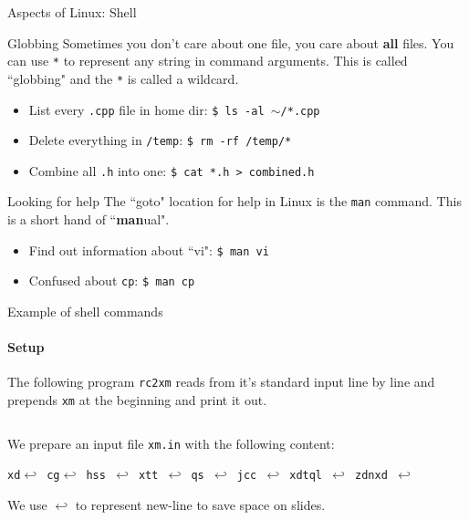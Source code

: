 \begin{frame}{Aspects of Linux: Shell}
\begin{block}{Globbing}
	Sometimes you don't care about one file, you care about \textbf{all} files. You can use \texttt{*} to represent any string in command arguments. This is called ``globbing" and the \texttt{*} is called a wildcard.
	
	\begin{itemize}
	\item List every \texttt{.cpp} file in home dir: \texttt{\$ ls -al $\sim$/*.cpp}
	\item Delete everything in \texttt{/temp}: \texttt{\$ rm -rf /temp/*}
	\item Combine all \texttt{.h} into one: \texttt{\$ cat *.h > combined.h}
	\end{itemize}
\end{block}

\begin{block}{Looking for help}
	The ``goto" location for help in Linux is the \texttt{man} command. This is a short hand of ``\textbf{man}ual". 
	\begin{itemize}
		\item Find out information about ``vi": \texttt{\$ man vi}
		\item Confused about \texttt{cp}: \texttt{\$ man cp}
	\end{itemize}
\end{block}
\end{frame}

\begin{frame}[fragile]{Example of shell commands}
\framesubtitle{Setup}
	The following program \texttt{rc2xm} reads from it's standard input line by line and prepends \texttt{xm} at the beginning and print it out. 
	\inputminted{c++}{code/rc2xm/xm.cpp}
	We prepare an input file \texttt{xm.in} with the following content:
	
	\small{\texttt{xd$\hookleftarrow$ cg$\hookleftarrow$ hss $\hookleftarrow$ xtt $\hookleftarrow$ qs $\hookleftarrow$ jcc $\hookleftarrow$ xdtql $\hookleftarrow$ zdnxd $\hookleftarrow$}}
	
	We use $\hookleftarrow$ to represent new-line to save space on slides.
\end{frame}

